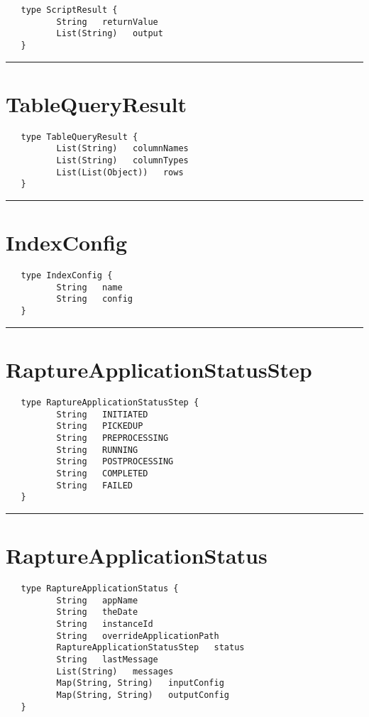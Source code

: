 \begin{verbatim}
   type ScriptResult {
          String   returnValue
          List(String)   output
   }
\end{verbatim}

\rule{12cm}{2pt}
\section{TableQueryResult}
\label{type:TableQueryResult}

\begin{verbatim}
   type TableQueryResult {
          List(String)   columnNames
          List(String)   columnTypes
          List(List(Object))   rows
   }
\end{verbatim}

\rule{12cm}{2pt}
\section{IndexConfig}
\label{type:IndexConfig}

\begin{verbatim}
   type IndexConfig {
          String   name
          String   config
   }
\end{verbatim}

\rule{12cm}{2pt}
\section{RaptureApplicationStatusStep}
\label{type:RaptureApplicationStatusStep}

\begin{verbatim}
   type RaptureApplicationStatusStep {
          String   INITIATED
          String   PICKEDUP
          String   PREPROCESSING
          String   RUNNING
          String   POSTPROCESSING
          String   COMPLETED
          String   FAILED
   }
\end{verbatim}

\rule{12cm}{2pt}
\section{RaptureApplicationStatus}
\label{type:RaptureApplicationStatus}

\begin{verbatim}
   type RaptureApplicationStatus {
          String   appName
          String   theDate
          String   instanceId
          String   overrideApplicationPath
          RaptureApplicationStatusStep   status
          String   lastMessage
          List(String)   messages
          Map(String, String)   inputConfig
          Map(String, String)   outputConfig
   }
\end{verbatim}

